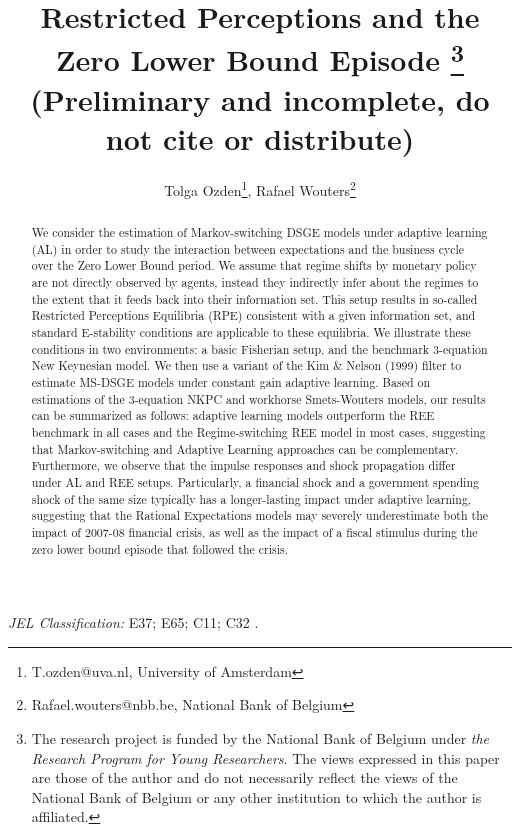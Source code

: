 \documentclass[12pt,reqno]{article}
\title{Restricted Perceptions and the Zero Lower Bound Episode \footnote{The research project is funded by the National Bank of Belgium under \textit{the Research Program for Young Researchers}. The views expressed in this paper are those of the author and do not necessarily reflect the views 
of the National Bank of Belgium or any other institution to which the author is affiliated.}\vspace{10 mm} \\ (Preliminary and incomplete, do not cite or distribute) }
\author{Tolga Ozden\footnote{T.ozden@uva.nl, University of Amsterdam}, Rafael Wouters\footnote{Rafael.wouters@nbb.be, National Bank of Belgium}}
\numberwithin{equation}{section}
\begin{document}
\maketitle



\begin{abstract}

We consider the estimation of Markov-switching DSGE models under adaptive learning (AL) in order to study the interaction between expectations and the business cycle over the Zero Lower Bound period. We assume that regime shifts by monetary policy are not directly observed by agents, instead they indirectly infer about the regimes to the extent that it feeds back into their information set. This setup results in so-called Restricted Perceptions Equilibria (RPE) consistent with a given information set, and standard E-stability conditions are applicable to these equilibria. We illustrate these conditions in two environments: a basic Fisherian setup, and the benchmark 3-equation New Keynesian model.
We then use a variant of the  Kim \& Nelson (1999) filter to estimate MS-DSGE models under constant gain adaptive learning. Based on estimations of the 3-equation NKPC and workhorse Smets-Wouters models, our results can be summarized as follows: adaptive learning models outperform the REE benchmark in all cases and the Regime-switching REE model in most cases, suggesting that Markov-switching and Adaptive Learning approaches can be complementary. Furthermore, we observe that the impulse responses and shock propagation differ under AL and REE setups. Particularly, a financial shock and a government spending shock of the same size typically has a longer-lasting impact under adaptive learning, suggesting that the Rational Expectations models may severely underestimate both the impact of 2007-08 financial crisis, as well as the impact of a fiscal stimulus during the zero lower bound episode that followed the crisis.  




\end{abstract}

\vspace{3 mm}

\noindent
\textit{JEL Classification:} E37; E65; C11; C32 . \\


\vspace{3 mm}
\end{document}
